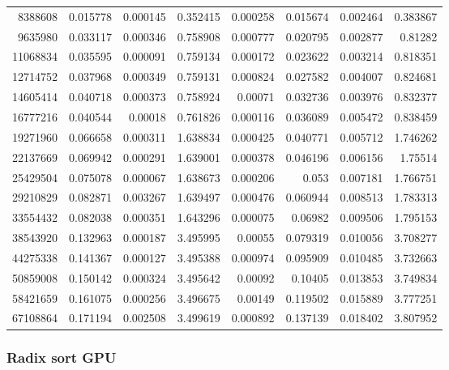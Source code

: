 \begin{longtable}{r r r r r r r r}
8388608 & 0.015778 & 0.000145 & 0.352415 & 0.000258 & 0.015674 & 0.002464 & 0.383867 \\
9635980 & 0.033117 & 0.000346 & 0.758908 & 0.000777 & 0.020795 & 0.002877 & 0.81282 \\
11068834 & 0.035595 & 0.000091 & 0.759134 & 0.000172 & 0.023622 & 0.003214 & 0.818351 \\
12714752 & 0.037968 & 0.000349 & 0.759131 & 0.000824 & 0.027582 & 0.004007 & 0.824681 \\
14605414 & 0.040718 & 0.000373 & 0.758924 & 0.00071 & 0.032736 & 0.003976 & 0.832377 \\
16777216 & 0.040544 & 0.00018 & 0.761826 & 0.000116 & 0.036089 & 0.005472 & 0.838459 \\
19271960 & 0.066658 & 0.000311 & 1.638834 & 0.000425 & 0.040771 & 0.005712 & 1.746262 \\
22137669 & 0.069942 & 0.000291 & 1.639001 & 0.000378 & 0.046196 & 0.006156 & 1.75514 \\
25429504 & 0.075078 & 0.000067 & 1.638673 & 0.000206 & 0.053 & 0.007181 & 1.766751 \\
29210829 & 0.082871 & 0.003267 & 1.639497 & 0.000476 & 0.060944 & 0.008513 & 1.783313 \\
33554432 & 0.082038 & 0.000351 & 1.643296 & 0.000075 & 0.06982 & 0.009506 & 1.795153 \\
38543920 & 0.132963 & 0.000187 & 3.495995 & 0.00055 & 0.079319 & 0.010056 & 3.708277 \\
44275338 & 0.141367 & 0.000127 & 3.495388 & 0.000974 & 0.095909 & 0.010485 & 3.732663 \\
50859008 & 0.150142 & 0.000324 & 3.495642 & 0.00092 & 0.10405 & 0.013853 & 3.749834 \\
58421659 & 0.161075 & 0.000256 & 3.496675 & 0.00149 & 0.119502 & 0.015889 & 3.777251 \\
67108864 & 0.171194 & 0.002508 & 3.499619 & 0.000892 & 0.137139 & 0.018402 & 3.807952 \\
\end{longtable}

\subsubsection{Radix sort GPU}

